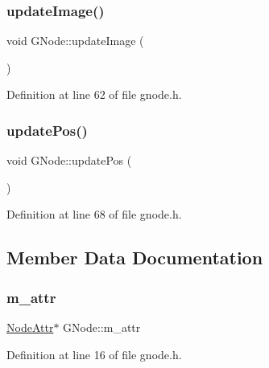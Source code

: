 \subsubsection{\texorpdfstring{update\+Image()}{updateImage()}}
{\footnotesize\ttfamily void G\+Node\+::update\+Image (\begin{DoxyParamCaption}{ }\end{DoxyParamCaption})\hspace{0.3cm}{\ttfamily [inline]}}



Definition at line 62 of file gnode.\+h.

\mbox{\label{struct_g_node_a3c38a45a7b98a63d3f240d8e62032fb8}} 
\subsubsection{\texorpdfstring{update\+Pos()}{updatePos()}}
{\footnotesize\ttfamily void G\+Node\+::update\+Pos (\begin{DoxyParamCaption}{ }\end{DoxyParamCaption})\hspace{0.3cm}{\ttfamily [inline]}}



Definition at line 68 of file gnode.\+h.



\subsection{Member Data Documentation}
\mbox{\label{struct_g_node_a9af79b0be58beeca8e76eef4d1798555}} 
\subsubsection{\texorpdfstring{m\+\_\+attr}{m\_attr}}
{\footnotesize\ttfamily \mbox{\hyperlink{struct_node_attr}{Node\+Attr}}$\ast$ G\+Node\+::m\+\_\+attr}



Definition at line 16 of file gnode.\+h.

\mbox{\label{struct_g_node_a3883c1648b5f4b39872eac62d0d9f74d}} 

